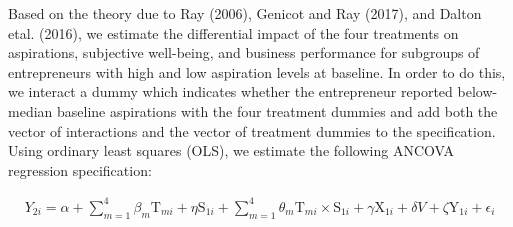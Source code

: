 \documentclass[11.5pt]{article}
\begin{document}



Based on the theory due to Ray (2006), Genicot and Ray (2017), and Dalton etal. (2016), we estimate the differential impact of the four treatments on aspirations, subjective well-being, and business performance for subgroups of entrepreneurs with high and low aspiration levels at baseline. In order to do this, we interact a dummy which indicates whether the entrepreneur reported below-median baseline aspirations with the four treatment dummies and add both the vector of interactions and the vector of treatment dummies to the specification. Using ordinary least squares (OLS), we estimate the following ANCOVA regression specification:

\begin{align}
    {Y}_{2i} = \alpha + \sum\limits_{m=1}^4 \beta_m \text{T}_{mi} + \eta \text{S}_{1i} + \sum\limits_{m=1}^4 \theta_m \text{T}_{mi} \times \text{S}_{1i} + \gamma \text{X}_{1i} + \delta {V} + \zeta \text{Y}_{1i} + \epsilon_i \label{eq:2}
\end{align}
\end{document}

